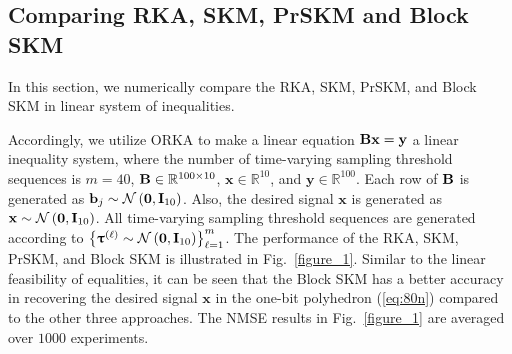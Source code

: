 \documentclass[12pt,draftcls,onecolumn]{IEEEtran}
\begin{document}
\subsection{Comparing RKA, SKM, PrSKM and Block SKM}
\label{NUM_COM}
In this section, we numerically compare the RKA, SKM, PrSKM, and Block SKM in linear system of
inequalities.

Accordingly, we utilize ORKA to make a linear equation $\mathbf{B}\mathbf{x}=\mathbf{y}$ a linear inequality system, where the number of time-varying sampling threshold sequences is $m=40$, $\mathbf{B}\in\mathbb{R}^{100\times 10}$, $\mathbf{x}\in\mathbb{R}^{10}$, and $\mathbf{y}\in\mathbb{R}^{100}$. Each row of $\mathbf{B}$ is generated as $\mathbf{b}_{j}\sim\mathcal{N}\left(\mathbf{0},\mathbf{I}_{10}\right)$. Also, the desired signal $\mathbf{x}$ is generated as $\mathbf{x}\sim\mathcal{N}\left(\mathbf{0},\mathbf{I}_{10}\right)$. All
time-varying sampling threshold sequences are generated according to
$\left\{\boldsymbol{\uptau}^{(\ell)}\sim\mathcal{N}\left(\mathbf{0},\mathbf{I}_{10}\right)\right\}_{\ell=1}^{m}$. The performance of the RKA, SKM, PrSKM, and Block SKM is illustrated in Fig.~\ref{figure_1}. Similar to the linear feasibility of equalities, it can be seen that the Block SKM has a better accuracy in recovering the desired signal $\mathbf{x}$ in the one-bit polyhedron (\ref{eq:80n}) compared to the other three approaches. The NMSE results in Fig.~\ref{figure_1} are averaged over $1000$ experiments.
\end{document}
